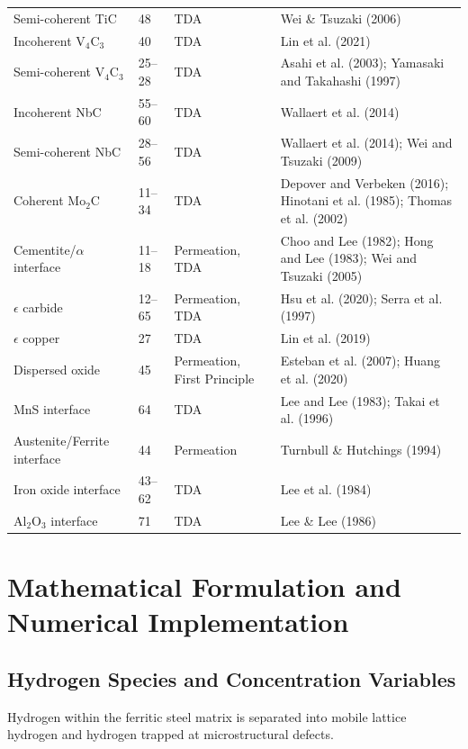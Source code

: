 \documentclass[a4paper,12pt,oneside]{report}
\begin{document}
\begin{table}[htbp]
{\begin{tabular}{@{}lL{2cm}L{3cm}L{6.5cm}@{}}
Semi-coherent TiC & 48 & TDA & Wei \& Tsuzaki (2006) \\
Incoherent V$_4$C$_3$ & 40 & TDA & Lin et al. (2021) \\
Semi-coherent V$_4$C$_3$ & 25--28 & TDA & Asahi et al. (2003); Yamasaki and Takahashi (1997) \\
Incoherent NbC & 55--60 & TDA & Wallaert et al. (2014) \\
Semi-coherent NbC & 28--56 & TDA & Wallaert et al. (2014); Wei and Tsuzaki (2009) \\
Coherent Mo$_2$C & 11--34 & TDA & Depover and Verbeken (2016); Hinotani et al. (1985); Thomas et al. (2002) \\
Cementite/$\alpha$ interface & 11--18 & Permeation, TDA & Choo and Lee (1982); Hong and Lee (1983); Wei and Tsuzaki (2005) \\
$\epsilon$ carbide & 12--65 & Permeation, TDA & Hsu et al. (2020); Serra et al. (1997) \\
$\epsilon$ copper & 27 & TDA & Lin et al. (2019) \\
Dispersed oxide & 45 & Permeation, First Principle & Esteban et al. (2007); Huang et al. (2020) \\
MnS interface & 64 & TDA & Lee and Lee (1983); Takai et al. (1996) \\
Austenite/Ferrite interface & 44 & Permeation & Turnbull \& Hutchings (1994) \\
Iron oxide interface & 43--62 & TDA & Lee et al. (1984) \\
Al$_2$O$_3$ interface & 71 & TDA & Lee \& Lee (1986) \\
\bottomrule
\end{tabular}
}
\end{table}

\chapter{Mathematical Formulation and Numerical Implementation}
\label{ch:formulation}

\section{Hydrogen Species and Concentration Variables}

Hydrogen within the ferritic steel matrix is separated into mobile lattice hydrogen and hydrogen trapped at microstructural defects.
\end{document}
